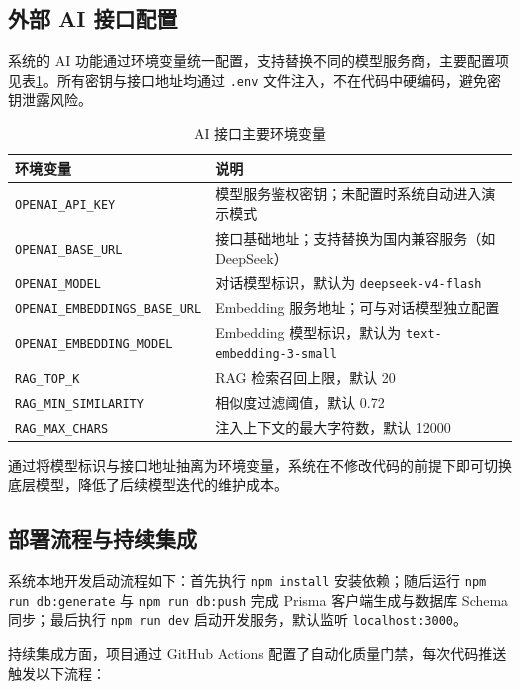 \documentclass[12pt,a4paper,oneside]{ctexbook}
\numberwithin{equation}{chapter}
\begin{document}
\subsection{外部 AI 接口配置}

系统的 AI 功能通过环境变量统一配置，支持替换不同的模型服务商，主要配置项见表\ref{tab:envConfig}。所有密钥与接口地址均通过 \texttt{.env} 文件注入，不在代码中硬编码，避免密钥泄露风险。

\begin{table}[H]
\centering
\caption{AI 接口主要环境变量}
\label{tab:envConfig}
\begin{tabular}{p{6cm}p{9cm}}
\toprule
环境变量 & 说明 \\
\midrule
\texttt{OPENAI\_API\_KEY} & 模型服务鉴权密钥；未配置时系统自动进入演示模式 \\
\texttt{OPENAI\_BASE\_URL} & 接口基础地址；支持替换为国内兼容服务（如 DeepSeek） \\
\texttt{OPENAI\_MODEL} & 对话模型标识，默认为 \texttt{deepseek-v4-flash} \\
\texttt{OPENAI\_EMBEDDINGS\_BASE\_URL} & Embedding 服务地址；可与对话模型独立配置 \\
\texttt{OPENAI\_EMBEDDING\_MODEL} & Embedding 模型标识，默认为 \texttt{text-embedding-3-small} \\
\texttt{RAG\_TOP\_K} & RAG 检索召回上限，默认 20 \\
\texttt{RAG\_MIN\_SIMILARITY} & 相似度过滤阈值，默认 0.72 \\
\texttt{RAG\_MAX\_CHARS} & 注入上下文的最大字符数，默认 12000 \\
\bottomrule
\end{tabular}
\end{table}

通过将模型标识与接口地址抽离为环境变量，系统在不修改代码的前提下即可切换底层模型，降低了后续模型迭代的维护成本。

\subsection{部署流程与持续集成}

系统本地开发启动流程如下：首先执行 \texttt{npm install} 安装依赖；随后运行 \texttt{npm run db:generate} 与 \texttt{npm run db:push} 完成 Prisma 客户端生成与数据库 Schema 同步；最后执行 \texttt{npm run dev} 启动开发服务，默认监听 \texttt{localhost:3000}。

持续集成方面，项目通过 GitHub Actions 配置了自动化质量门禁，每次代码推送触发以下流程：
\end{document}
